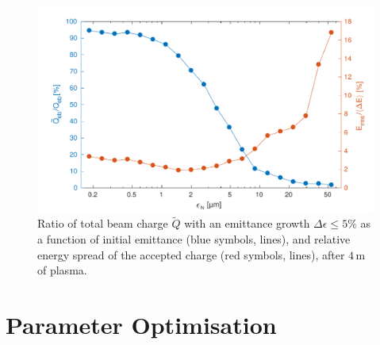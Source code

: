 \documentclass[aps,prstab,reprint,amsmath,amssymb,groupedaddress]{revtex4-1}
\newcommand{\unit}[1]{\,\mathrm{#1}}
\begin{document}
\begin{figure}[hbt]
    \includegraphics[width=\linewidth,trim={2mm 0mm 2mm 0mm},clip]{figures/beamQualityEmittance}
    \caption{\label{Fig:BeamQEmit} Ratio of total beam charge $\widetilde{Q}$ with an emittance growth
        $\Delta\epsilon \leq 5\%$ as a function of initial emittance (blue symbols, lines), and relative energy spread
        of the accepted charge (red symbols, lines), after $4\unit{m}$ of plasma.}
\end{figure}

\section{Parameter Optimisation}\label{S:PO}
\end{document}
